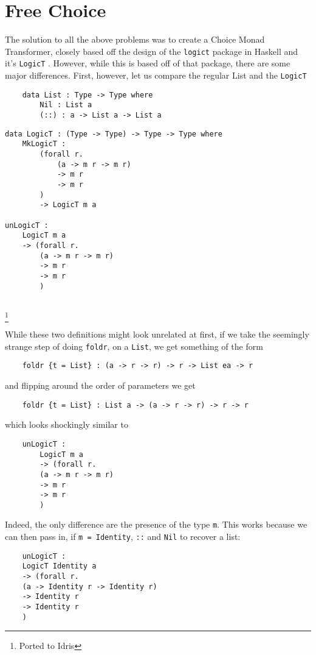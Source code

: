 \section{Free Choice}

The solution to all the above problems was to create a Choice Monad Transformer, closely based off the design of the \verb|logict| package in Haskell and it's \verb|LogicT| \cite{logict}.
However, while this is based off of that package, there are some major differences.
First, however, let us compare the regular List and the \verb|LogicT|


\begin{verbatim}
	data List : Type -> Type where 
		Nil : List a
		(::) : a -> List a -> List a
\end{verbatim}

\begin{verbatim}
data LogicT : (Type -> Type) -> Type -> Type where 
	MkLogicT : 
		(forall r. 
			(a -> m r -> m r) 
			-> m r 
			-> m r
		) 
		-> LogicT m a
		
unLogicT : 
	LogicT m a
	-> (forall r. 
		(a -> m r -> m r) 
		-> m r 
		-> m r
		) 
		
\end{verbatim}
\footnote{Ported to Idris}

While these two definitions might look unrelated at first, if we take the seemingly strange step of doing \verb|foldr|, on a \verb|List|, we get something of the form 
\begin{verbatim}
	foldr {t = List} : (a -> r -> r) -> r -> List ea -> r	
\end{verbatim}

and flipping around the order of parameters we get
\begin{verbatim}
	foldr {t = List} : List a -> (a -> r -> r) -> r -> r	
\end{verbatim}

which looks shockingly similar to 
\begin{verbatim}
	unLogicT :
		LogicT m a
		-> (forall r. 
		(a -> m r -> m r) 
		-> m r 
		-> m r
		) 
\end{verbatim}

Indeed, the only difference are the presence of the type \verb|m|.
This works because we can then pass in, if \verb|m = Identity|, \verb|::| and \verb|Nil| to recover a list:
\begin{verbatim}
	unLogicT :
	LogicT Identity a
	-> (forall r. 
	(a -> Identity r -> Identity r) 
	-> Identity r 
	-> Identity r
	) 
\end{verbatim}

